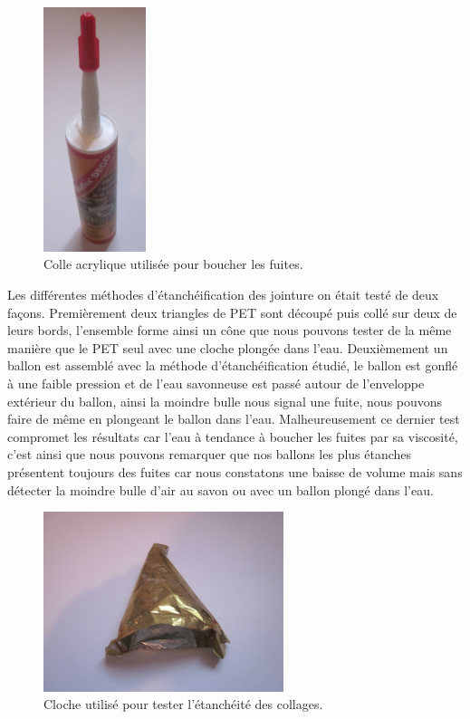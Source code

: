 \documentclass[a4paper,11pt]{article}
\begin{document}
\begin{figure}[H]
 \centering
 \includegraphics[width=3cm]{../Images/colle_acrylique.JPG}
 \caption{Colle acrylique utilisée pour boucher les fuites.}
\end{figure}


Les différentes méthodes d'étanchéification des jointure on était testé de deux façons.
Premièrement deux triangles de PET sont découpé puis collé sur deux de leurs bords, l'ensemble forme ainsi un cône que nous pouvons tester de la même manière que le PET seul avec une cloche plongée dans l'eau.
Deuxièmement un ballon est assemblé avec la méthode d'étanchéification étudié, le ballon est gonflé à une faible pression et de l'eau savonneuse est passé autour de l'enveloppe extérieur du ballon, ainsi la moindre bulle nous signal une fuite, nous pouvons faire de même en plongeant le ballon dans l'eau. Malheureusement ce dernier test compromet les résultats car l'eau à tendance à boucher les fuites par sa viscosité, c'est ainsi que nous pouvons remarquer que nos ballons les plus étanches présentent toujours des fuites car nous constatons une baisse de volume mais sans détecter la moindre bulle d'air au savon ou avec un ballon plongé dans l'eau.


\begin{figure}[H]
 \centering
 \includegraphics[width=7cm]{../Images/cloche_colle.JPG}
 \caption{Cloche utilisé pour tester l'étanchéité des collages.}
\end{figure}
\end{document}
